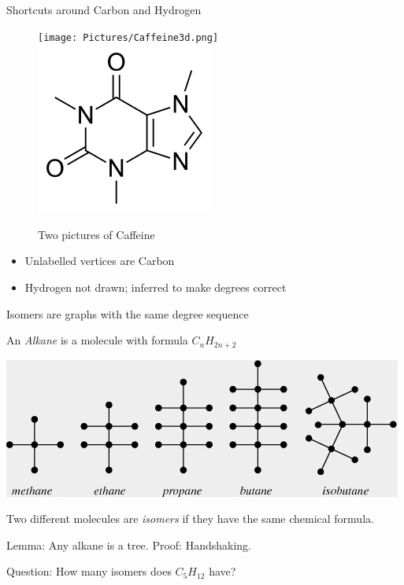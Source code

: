 \documentclass{beamer}
\begin{document}
\begin{frame}{Shortcuts around Carbon and Hydrogen}
  \begin{figure}
    \texttt{[image: Pictures/Caffeine3d.png]}
    \includegraphics[width=.5\textwidth]{Pictures/Caffeine_structure.png}
    \caption{Two pictures of Caffeine}
  \end{figure}
  \begin{itemize}
  \item Unlabelled vertices are Carbon
  \item Hydrogen not drawn; inferred to make degrees correct
  \end{itemize}
\end{frame}

\begin{frame}{Isomers are graphs with the same degree sequence}
  \begin{definition}An \emph{Alkane} is a molecule with formula $C_nH_{2n+2}$
  \end{definition}
  \includegraphics[width=.8\textwidth]{Pictures/Hydrocarbons.jpg}
\begin{definition}[Isomer] Two different molecules are \emph{isomers} if they have the same chemical formula.
 \end{definition}
  
\begin{block}{Lemma: Any alkane is a tree.}
  Proof: Handshaking.
  \end{block}
\begin{block}{Question: How many isomers does $C_5H_{12}$ have?}
\end{block}
\end{frame}
\end{document}

